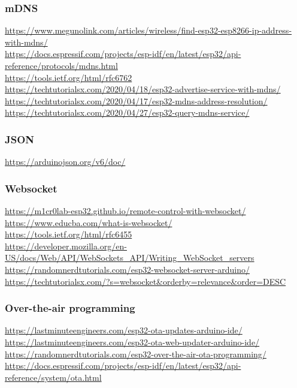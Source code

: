\documentclass[11pt,a4paper]{article}
\begin{document}
\subsubsection{mDNS}

\url{https://www.megunolink.com/articles/wireless/find-esp32-esp8266-ip-address-with-mdns/}\\[4pt]
\url{https://docs.espressif.com/projects/esp-idf/en/latest/esp32/api-reference/protocols/mdns.html}\\[4pt]
\url{https://tools.ietf.org/html/rfc6762}\\[4pt]
\url{https://techtutorialsx.com/2020/04/18/esp32-advertise-service-with-mdns/}\\[4pt]
\url{https://techtutorialsx.com/2020/04/17/esp32-mdns-address-resolution/}\\[4pt]
\url{https://techtutorialsx.com/2020/04/27/esp32-query-mdns-service/}

\subsubsection{JSON}

\url{https://arduinojson.org/v6/doc/}

\subsubsection{Websocket}

\url{https://m1cr0lab-esp32.github.io/remote-control-with-websocket/}\\[4pt]
\url{https://www.educba.com/what-is-websocket/}\\[4pt]
\url{https://tools.ietf.org/html/rfc6455}\\[4pt]
\url{https://developer.mozilla.org/en-US/docs/Web/API/WebSockets_API/Writing_WebSocket_servers}\\[4pt]
\url{https://randomnerdtutorials.com/esp32-websocket-server-arduino/}\\[4pt]
\url{https://techtutorialsx.com/?s=websocket&orderby=relevance&order=DESC}

\subsubsection{Over-the-air programming}

\url{https://lastminuteengineers.com/esp32-ota-updates-arduino-ide/}\\[4pt]
\url{https://lastminuteengineers.com/esp32-ota-web-updater-arduino-ide/}\\[4pt]
\url{https://randomnerdtutorials.com/esp32-over-the-air-ota-programming/}\\[4pt]
\url{https://docs.espressif.com/projects/esp-idf/en/latest/esp32/api-reference/system/ota.html}
\end{document}
